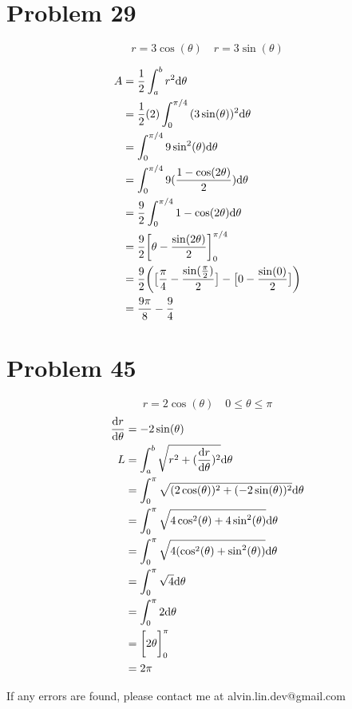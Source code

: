 \documentclass[letterpaper, 12pt]{math}
\begin{document}
\section*{Problem 29}
\[ r = 3\cos(\theta) \quad r = 3\sin(\theta) \]
\begin{center}
\end{center}
\begin{align*}
  A &= \frac{1}{2}\int_{a}^{b}{r^{2}\mathrm{d}{\theta}} \\
  &= \frac{1}{2}(2)\int_{0}^{\pi/4}{(3\sin(\theta))^{2}\mathrm{d}{\theta}} \\
  &= \int_{0}^{\pi/4}{9\sin^{2}(\theta)\mathrm{d}{\theta}} \\
  &= \int_{0}^{\pi/4}{9(\frac{1-\cos(2\theta)}{2})\mathrm{d}{\theta}} \\
  &= \frac{9}{2}\int_{0}^{\pi/4}{1-\cos(2\theta)\mathrm{d}{\theta}} \\
  &= \frac{9}{2}\bigg[\theta-\frac{\sin(2\theta)}{2}\bigg]_{0}^{\pi/4} \\
  &= \frac{9}{2}\bigg(\big[\frac{\pi}{4}-\frac{\sin(\frac{\pi}{2})}{2}\big]-
    \big[0-\frac{\sin(0)}{2}\big]\bigg) \\
  &= \frac{9\pi}{8}-\frac{9}{4}
\end{align*}

\section*{Problem 45}
\[ r = 2\cos(\theta) \quad 0 \leq \theta \leq \pi \]
\begin{align*}
  \frac{\mathrm{d}{r}}{\mathrm{d}{\theta}} &= -2\sin(\theta) \\
  L &= \int_{a}^{b}{\sqrt{r^{2}+(\frac{\mathrm{d}{r}}{\mathrm{d}{\theta}})^{2}}\mathrm{d}{\theta}} \\
  &= \int_{0}^{\pi}
    {\sqrt{(2\cos(\theta))^{2}+(-2\sin(\theta))^{2}}\mathrm{d}{\theta}} \\
  &= \int_{0}^{\pi}
    {\sqrt{4\cos^{2}(\theta)+4\sin^{2}(\theta)}\mathrm{d}{\theta}} \\
  &= \int_{0}^{\pi}
    {\sqrt{4(\cos^{2}(\theta)+\sin^{2}(\theta))}\mathrm{d}{\theta}} \\
  &= \int_{0}^{\pi}{\sqrt{4}\mathrm{d}{\theta}} \\
  &= \int_{0}^{\pi}{2\mathrm{d}{\theta}} \\
  &= \bigg[2\theta\bigg]_{0}^{\pi} \\
  &= 2\pi
\end{align*}

\begin{center}
  If any errors are found, please contact me at alvin.lin.dev@gmail.com
\end{center}
\end{document}
